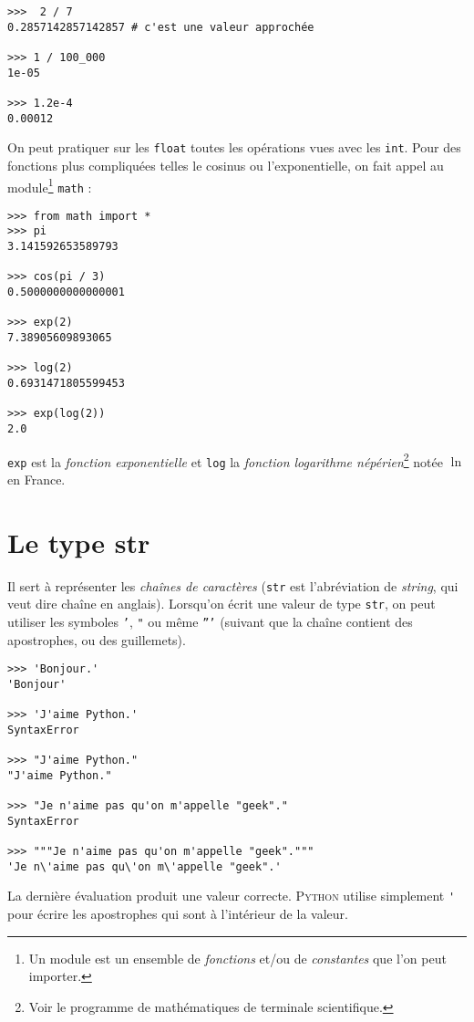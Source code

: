 \begin{pyc}\begin{verbatim}
>>>  2 / 7
0.2857142857142857 # c'est une valeur approchée

>>> 1 / 100_000
1e-05

>>> 1.2e-4
0.00012
\end{verbatim}
\end{pyc}

On peut pratiquer sur les \texttt{float} toutes les opérations vues avec les \texttt{int}. Pour des fonctions plus compliquées telles le cosinus ou
l'exponentielle, on fait appel au module\footnote{Un module est un ensemble de \textit{fonctions} et/ou de \textit{constantes} que l'on peut importer.}
\texttt{math} :

\begin{pyc}\begin{verbatim}
>>> from math import *
>>> pi
3.141592653589793

>>> cos(pi / 3)
0.5000000000000001

>>> exp(2)
7.38905609893065

>>> log(2)
0.6931471805599453

>>> exp(log(2))
2.0
\end{verbatim}
\end{pyc}

\texttt{exp} est la \textit{fonction exponentielle} et \texttt{log} la \textit{fonction logarithme népérien}\footnote{Voir le programme de mathématiques
    de terminale scientifique.} notée $\ln$ en France.



\section{Le type str}

Il sert à représenter les \textit{chaînes de caractères} (\texttt{str} est l'abréviation de \textit{string}, qui veut dire chaîne en anglais).
Lorsqu'on écrit une valeur de type \texttt{str}, on peut utiliser les symboles \texttt{'}, \texttt{"} ou même \texttt{'''} (suivant que la chaîne contient des apostrophes, ou des guillemets).

\begin{pyc}\begin{verbatim}
>>> 'Bonjour.'
'Bonjour'

>>> 'J'aime Python.'
SyntaxError

>>> "J'aime Python."
"J'aime Python."

>>> "Je n'aime pas qu'on m'appelle "geek"."
SyntaxError

>>> """Je n'aime pas qu'on m'appelle "geek"."""
'Je n\'aime pas qu\'on m\'appelle "geek".'
\end{verbatim}
\end{pyc}
La dernière évaluation produit une valeur correcte. \textsc{Python} utilise simplement \texttt{\'} pour écrire les apostrophes qui sont à l'intérieur de la valeur.\\


